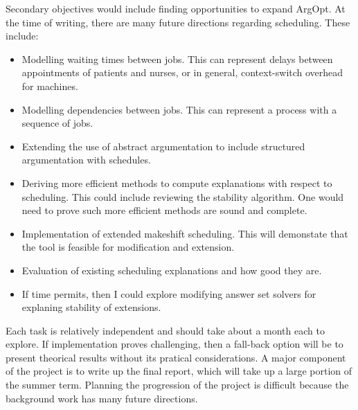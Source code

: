 Secondary objectives would include finding opportunities to expand ArgOpt. At the time of writing, there are many future directions regarding scheduling. These include:
\begin{itemize}
	\item Modelling waiting times between jobs. This can represent delays between appointments of patients and nurses, or in general, context-switch overhead for machines.
	\item Modelling dependencies between jobs. This can represent a process with a sequence of jobs.
	\item Extending the use of abstract argumentation to include structured argumentation with schedules.
	\item Deriving more efficient methods to compute explanations with respect to scheduling. This could include reviewing the stability algorithm. One would need to prove such more efficient methods are sound and complete.
	\item Implementation of extended makeshift scheduling. This will demonstate that the tool is feasible for modification and extension.
	\item Evaluation of existing scheduling explanations and how good they are.
	\item If time permits, then I could explore modifying answer set solvers for explaning stability of extensions.
\end{itemize}

Each task is relatively independent and should take about a month each to explore. If implementation proves challenging, then a fall-back option will be to present theorical results without its pratical considerations. A major component of the project is to write up the final report, which will take up a large portion of the summer term. Planning the progression of the project is difficult because the background work has many future directions.
